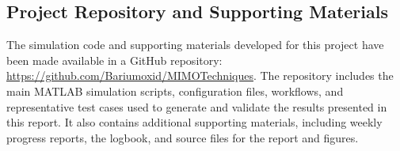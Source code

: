 \documentclass[a4paper,12pt,onecolumn]{article}
\begin{document}
\newpage
\subsection{Project Repository and Supporting Materials}
The simulation code and supporting materials developed for this project have been made available in a GitHub repository: \url{https://github.com/Bariumoxid/MIMOTechniques}. The repository includes the main MATLAB simulation scripts, configuration files, workflows, and representative test cases used to generate and validate the results presented in this report. It also contains additional supporting materials, including weekly progress reports, the logbook, and source files for the report and figures.
\end{document}
